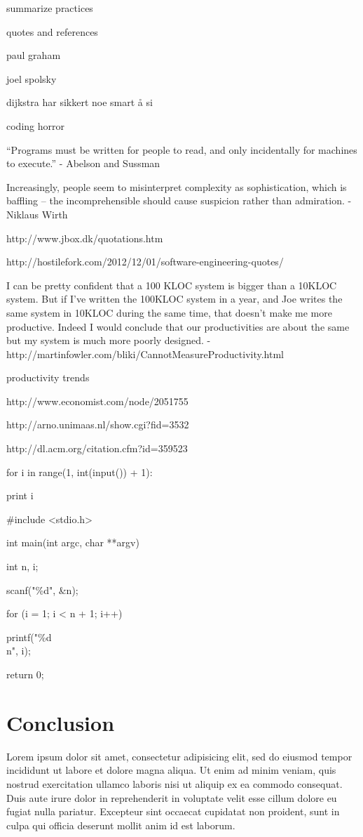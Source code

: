 \documentclass[letterpaper, 12pt]{report}
\begin{document}
	summarize practices



quotes and references

paul graham

joel spolsky

dijkstra har sikkert noe smart å si

coding horror

``Programs must be written for people to read, and only incidentally for machines to execute.'' - Abelson and Sussman

Increasingly, people seem to misinterpret complexity as sophistication, which is baffling -- the incomprehensible should cause suspicion rather than admiration. - Niklaus Wirth

http://www.jbox.dk/quotations.htm

http://hostilefork.com/2012/12/01/software-engineering-quotes/

I can be pretty confident that a 100 KLOC system is bigger than a 10KLOC system. But if I've written the 100KLOC system in a year, and Joe writes the same system in 10KLOC during the same time, that doesn't make me more productive. Indeed I would conclude that our productivities are about the same but my system is much more poorly designed. - http://martinfowler.com/bliki/CannotMeasureProductivity.html

productivity trends 

	http://www.economist.com/node/2051755

	http://arno.unimaas.nl/show.cgi?fid=3532



http://dl.acm.org/citation.cfm?id=359523



for i in range(1, int(input()) + 1):

	print i



\#include <stdio.h>

int main(int argc, char **argv) {

	int n, i;

	scanf("\%d", \&n);

	for (i = 1; i < n + 1; i++) {

		printf("\%d\\n", i);

	}

	return 0;

}



\chapter{Conclusion}
Lorem ipsum dolor sit amet, consectetur adipisicing elit, sed do eiusmod tempor incididunt ut labore et dolore magna aliqua. Ut enim ad minim veniam, quis nostrud exercitation ullamco laboris nisi ut aliquip ex ea commodo consequat. Duis aute irure dolor in reprehenderit in voluptate velit esse cillum dolore eu fugiat nulla pariatur. Excepteur sint occaecat cupidatat non proident, sunt in culpa qui officia deserunt mollit anim id est laborum.
\end{document}
